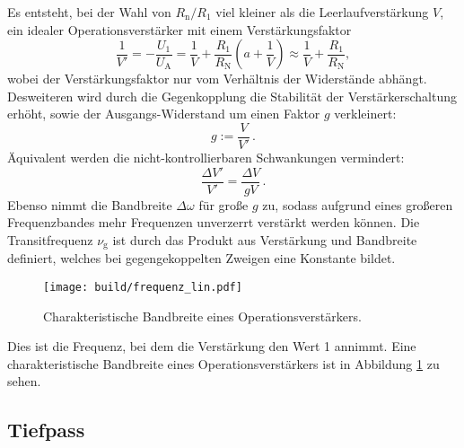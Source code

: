 Es entsteht, bei der Wahl von $R_\text{n}/ R_\text{1}$ viel kleiner als die
Leerlaufverstärkung $V$, ein idealer Operationsverstärker mit einem Verstärkungsfaktor
\begin{equation}
  \label{eq:v_strich}
		\frac{1}{V'}= - \frac{U_1}{U_\text{A}} = \frac{1}{V} +
		\frac{R_1}{R_\text{N}} \left( a + \frac{1}{V} \right) \approx
		\frac{1}{V} + \frac{R_1}{R_\text{N}},
\end{equation}
wobei der Verstärkungsfaktor nur vom Verhältnis der Widerstände abhängt.
Desweiteren wird durch die Gegenkopplung die Stabilität der
Verstärkerschaltung erhöht, sowie der Ausgangs-Widerstand um einen
Faktor $g$ verkleinert:
\begin{equation}
		g := \frac{V}{V'} \, .
\end{equation}
Äquivalent werden die nicht-kontrollierbaren Schwankungen vermindert:
\begin{equation}
		\frac{\Delta V'}{V'} = \frac{\Delta V}{g V} \, .
\end{equation}
Ebenso nimmt die Bandbreite $\Delta \omega$ für große $g$ zu, sodass aufgrund eines großeren
Frequenzbandes mehr Frequenzen unverzerrt verstärkt werden können.
Die Transitfrequenz $\nu_\text{g}$ ist durch das Produkt aus Verstärkung und
Bandbreite definiert, welches bei gegengekoppelten Zweigen eine Konstante
bildet.
\begin{figure}[ht]
		\centering
		\texttt{[image: build/frequenz\_lin.pdf]}
		\caption{Charakteristische Bandbreite eines Operationsverstärkers.\cite{anleitung}}
		\label{fig:freq}
\end{figure}
Dies ist die Frequenz, bei dem die Verstärkung den Wert 1 annimmt.
Eine charakteristische Bandbreite eines Operationsverstärkers ist in Abbildung
\ref{fig:freq} zu sehen.

\subsection{Tiefpass}%
\label{sub:tiefpass}

